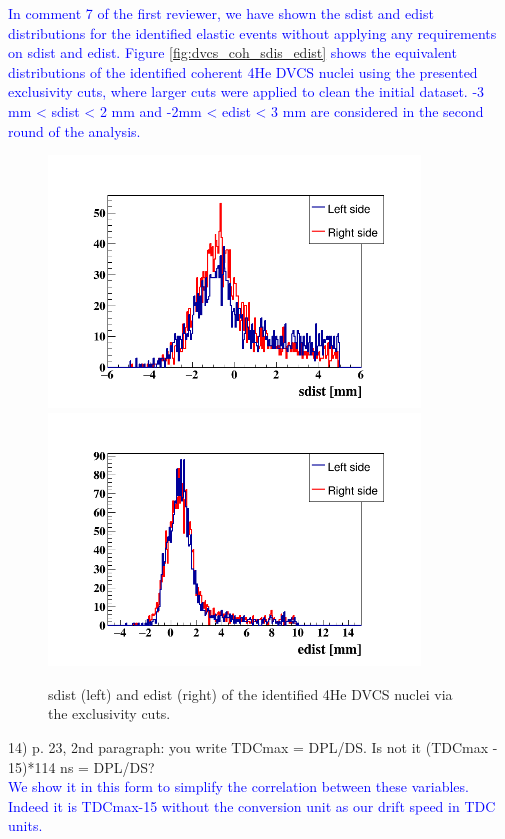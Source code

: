 \textcolor{blue}{ In comment 7 of the first reviewer, we have shown the sdist 
   and edist distributions for the identified elastic events without applying 
   any requirements on sdist and edist. Figure \ref{fig:dvcs_coh_sdis_edist} 
   shows the equivalent distributions of the identified coherent 4He DVCS 
   nuclei using the presented exclusivity cuts, where larger cuts were applied 
to clean the initial dataset. -3 mm < sdist < 2 mm and -2mm < edist < 3 mm are 
considered in the second round of the analysis. }\\ 

\begin{figure}[h!]
   \hspace{-1.0cm}
   \includegraphics[height=6.7cm]{fig/coh_rtpc_sdist.png}
\includegraphics[height=6.7cm]{fig/coh_rtpc_edist.png}
\caption{sdist (left) and edist (right) of the identified 4He DVCS nuclei via 
the exclusivity cuts.}
\label{fig:dvcs_coh_sdist_edist}
 \end{figure}


14) p. 23, 2nd paragraph: you write TDCmax = DPL/DS. Is not it (TDCmax - 
15)*114 ns = DPL/DS?\\
\textcolor{blue}{ We show it in this form to simplify the correlation between 
these variables.  Indeed it is  TDCmax-15 without the conversion unit as our 
drift speed in TDC units. } \\

